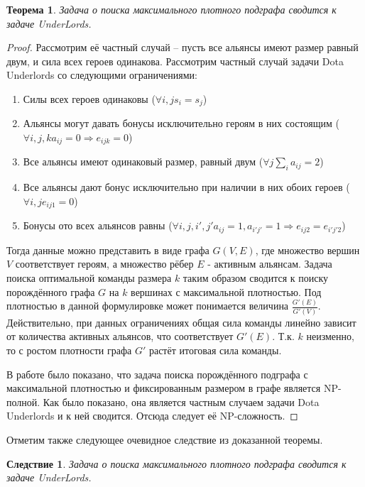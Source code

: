 \documentclass{article}
\newtheorem{theorem}{Теорема}
\newtheorem{corollary}{Следствие}
\begin{document}
\begin{theorem}
\label{MEWC_DU}
Задача о поиска максимального плотного подграфа сводится к задаче UnderLords.
\end{theorem}
\begin{proof}
Рассмотрим её частный случай -- пусть все альянсы имеют размер равный двум, и сила всех героев одинакова. Рассмотрим частный случай задачи Dota Underlords со следующими ограничениями:

\begin{enumerate}
    \item Силы всех героев одинаковы ($\forall i, j s_i=s_j$)
    \item Альянсы могут давать бонусы исключительно героям в них состоящим ($\forall i, j, k a_{ij}=0 \Longrightarrow e_{ijk} = 0$)
    \item Все альянсы имеют одинаковый размер, равный двум ($\forall j \sum_i a_{ij}=2$)
    \item Все альянсы дают бонус исключительно при наличии в них обоих героев ($\forall i, j e_{ij1}=0$)
    \item Бонусы ото всех альянсов равны ($\forall i, j, i', j' a_{ij}=1, a_{i' j'}=1 \Longrightarrow e_{ij2}=e_{i' j' 2}$)
\end{enumerate}

Тогда данные можно представить в виде графа $G(V, E)$, где множество вершин $V$ соответствует героям, а множество рёбер $E$ - активным альянсам. Задача поиска оптимальной команды размера $k$ таким образом сводится к поиску порождённого графа $G$ на $k$ вершинах с максимальной плотностью. Под плотностью в данной формулировке может понимается величина $\frac{G'(E)}{G'(V)}$. Действительно, при данных ограничениях общая сила команды линейно зависит от количества активных альянсов, что соответствует $G'(E)$. Т.к. $k$ неизменно, то с ростом плотности графа $G'$ растёт итоговая сила команды.

В работе \cite{downey1995fixed} было показано, что задача поиска порождённого подграфа с максимальной плотностью и фиксированным размером в графе является NP-полной. Как было показано, она является частным случаем задачи Dota Underlords и к ней сводится. Отсюда следует её NP-сложность.

\end{proof}

Отметим также следующее очевидное следствие из доказанной теоремы.

\begin{corollary}
    Задача о поиска максимального плотного подграфа сводится к задаче UnderLords.
    \label{MEWC_DU_cor}
\end{corollary}
\end{document}
